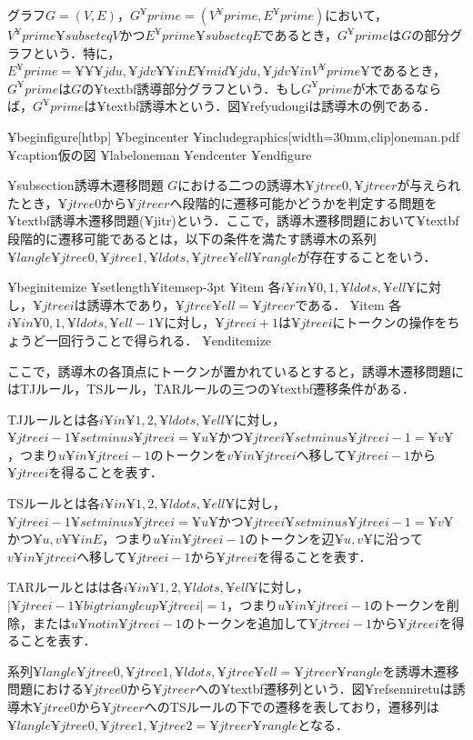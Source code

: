 グラフ$G=(V,E)$，$G^¥prime=(V^¥prime,E^¥prime)$において，$V^¥prime ¥subseteq V$かつ$E^¥prime ¥subseteq E$であるとき，$G^¥prime$は$G$の部分グラフという．特に，$E^¥prime=¥{¥{¥jdu,¥jdv¥}¥in E¥mid ¥jdu,¥jdv¥in V^¥prime¥}$であるとき，$G^¥prime$は$G$の¥textbf{誘導部分グラフ}という．もし$G^¥prime$が木であるならば，$G^¥prime$は¥textbf{誘導木}という．図¥ref{yudougi}は誘導木の例である．

¥begin{figure}[htbp]
	¥begin{center}
		¥includegraphics[width=30mm,clip]{oneman.pdf}
		¥caption{仮の図}
		¥label{oneman}
	¥end{center}
¥end{figure}

¥subsection{誘導木遷移問題}
$G$における二つの誘導木$¥jtree{0},¥jtree{r}$が与えられたとき，$¥jtree{0}$から$¥jtree{r}$へ段階的に遷移可能かどうかを判定する問題を¥textbf{誘導木遷移問題(¥jitr)}という．ここで，誘導木遷移問題において¥textbf{段階的に遷移可能}であるとは，以下の条件を満たす誘導木の系列$¥langle ¥jtree{0},¥jtree{1},¥ldots,¥jtree{¥ell}¥rangle$が存在することをいう．

¥begin{itemize}
	¥setlength{¥itemsep}{-3pt}
	¥item 各$i ¥in ¥{0,1, ¥ldots ,¥ell¥}$に対し，$¥jtree{i}$は誘導木であり，$¥jtree{¥ell}=¥jtree{r}$である．
	¥item 各$i ¥in ¥{0,1, ¥ldots ,¥ell-1¥}$に対し，$¥jtree{i+1}$は$¥jtree{i}$にトークンの操作をちょうど一回行うことで得られる．
¥end{itemize}

ここで，誘導木の各頂点にトークンが置かれているとすると，誘導木遷移問題にはTJルール，TSルール，TARルールの三つの¥textbf{遷移条件}がある．

TJルールとは各$i ¥in ¥{1,2,¥ldots,¥ell¥}$に対し，$¥jtree{i-1}¥setminus ¥jtree{i}=¥{u¥}$かつ$¥jtree{i}¥setminus ¥jtree{i-1}=¥{v¥}$，つまり$u¥in ¥jtree{i-1}$のトークンを$v¥in ¥jtree{i}$へ移して$¥jtree{i-1}$から$¥jtree{i}$を得ることを表す．

TSルールとは各$i ¥in ¥{1,2,¥ldots,¥ell¥}$に対し，$¥jtree{i-1}¥setminus ¥jtree{i}=¥{u¥}$かつ$¥jtree{i}¥setminus ¥jtree{i-1}=¥{v¥}$かつ$¥{u,v¥}¥in E$，つまり$u¥in ¥jtree{i-1}$のトークンを辺$¥{u,v¥}$に沿って$v¥in ¥jtree{i}$へ移して$¥jtree{i-1}$から$¥jtree{i}$を得ることを表す．

TARルールとはは各$i ¥in ¥{1,2,¥ldots,¥ell¥}$に対し，$|¥jtree{i-1}¥bigtriangleup ¥jtree{i}|=1$，つまり$u¥in ¥jtree{i-1}$のトークンを削除，または$u¥notin ¥jtree{i-1}$のトークンを追加して$¥jtree{i-1}$から$¥jtree{i}$を得ることを表す．

系列$¥langle ¥jtree{0},¥jtree{1},¥ldots,¥jtree{¥ell}=¥jtree{r}¥rangle$を誘導木遷移問題における$¥jtree{0}$から$¥jtree{r}$への¥textbf{遷移列}という．図¥ref{senniretu}は誘導木$¥jtree{0}$から$¥jtree{r}$へのTSルールの下での遷移を表しており，遷移列は$¥langle ¥jtree{0},¥jtree{1},¥jtree{2}=¥jtree{r}¥rangle$となる．

